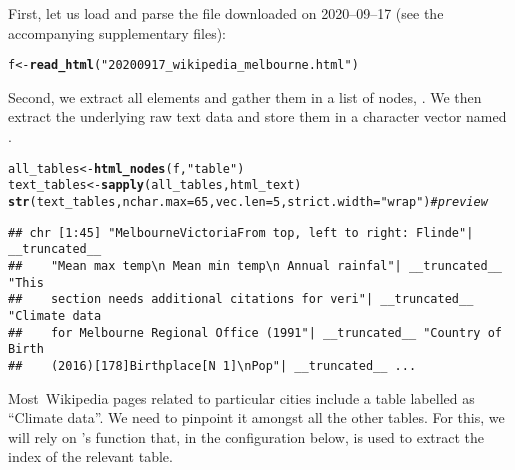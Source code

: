 \documentclass[nojss]{jss}\usepackage[]{graphicx}\usepackage[]{xcolor}
\makeatletter
\newcommand{\hlnum}[1]{\textcolor[rgb]{0.686,0.059,0.569}{#1}}%
\newcommand{\hlstr}[1]{\textcolor[rgb]{0.192,0.494,0.8}{#1}}%
\newcommand{\hlcom}[1]{\textcolor[rgb]{0.678,0.584,0.686}{\textit{#1}}}%
\newcommand{\hlstd}[1]{\textcolor[rgb]{0.345,0.345,0.345}{#1}}%
\newcommand{\hlkwb}[1]{\textcolor[rgb]{0.69,0.353,0.396}{#1}}%
\newcommand{\hlkwc}[1]{\textcolor[rgb]{0.333,0.667,0.333}{#1}}%
\newcommand{\hlkwd}[1]{\textcolor[rgb]{0.737,0.353,0.396}{\textbf{#1}}}%
\newenvironment{kframe}{%
 \def\at@end@of@kframe{}%
 \ifinner\ifhmode%
  \def\at@end@of@kframe{\end{minipage}}%
  \begin{minipage}{\columnwidth}%
 \fi\fi%
 \def\FrameCommand##1{\hskip\@totalleftmargin \hskip-\fboxsep
 \colorbox{shadecolor}{##1}\hskip-\fboxsep
     \hskip-\linewidth \hskip-\@totalleftmargin \hskip\columnwidth}%
 \MakeFramed {\advance\hsize-\width
   \@totalleftmargin\z@ \linewidth\hsize
   \@setminipage}}%
 {\par\unskip\endMakeFramed%
 \at@end@of@kframe}
\newenvironment{knitrout}{}{} %
\makeatother
\begin{document}
First, let us load and parse the  file
downloaded on 2020--09--17 (see the accompanying supplementary files):

\begin{knitrout}
\color{fgcolor}\begin{kframe}
\begin{alltt}
\hlstd{f} \hlkwb{<-} \hlkwd{read_html}\hlstd{(}\hlstr{"20200917_wikipedia_melbourne.html"}\hlstd{)}
\end{alltt}
\end{kframe}
\end{knitrout}

Second, we extract all  elements and gather them
in a list of  nodes, .
We then extract the underlying raw text data and store them in a
character vector named .

\begin{knitrout}
\color{fgcolor}\begin{kframe}
\begin{alltt}
\hlstd{all_tables} \hlkwb{<-} \hlkwd{html_nodes}\hlstd{(f,} \hlstr{"table"}\hlstd{)}
\hlstd{text_tables} \hlkwb{<-} \hlkwd{sapply}\hlstd{(all_tables, html_text)}
\hlkwd{str}\hlstd{(text_tables,} \hlkwc{nchar.max}\hlstd{=}\hlnum{65}\hlstd{,} \hlkwc{vec.len}\hlstd{=}\hlnum{5}\hlstd{,} \hlkwc{strict.width}\hlstd{=}\hlstr{"wrap"}\hlstd{)} \hlcom{# preview}
\end{alltt}
\begin{verbatim}
## chr [1:45] "MelbourneVictoriaFrom top, left to right: Flinde"| __truncated__
##    "Mean max temp\n Mean min temp\n Annual rainfal"| __truncated__ "This
##    section needs additional citations for veri"| __truncated__ "Climate data
##    for Melbourne Regional Office (1991"| __truncated__ "Country of Birth
##    (2016)[178]Birthplace[N 1]\nPop"| __truncated__ ...
\end{verbatim}
\end{kframe}
\end{knitrout}

Most~Wikipedia pages related to particular cities
include a table labelled as ``Climate data''.
We need to pinpoint it amongst all the other tables.
For this, we will rely on 's
 function that, in the configuration
below, is used to extract the index of the relevant table.
\end{document}

